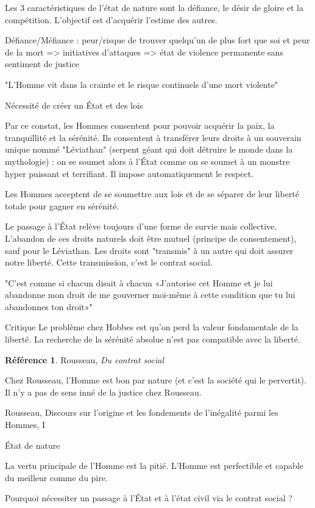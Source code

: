 \documentclass[french]{book}
\theoremstyle{definition}
\newtheorem*{refe}{Référence}
\begin{document}
Les 3 caractéristiques de l'état de nature sont la défiance, le désir de gloire et la compétition. L'objectif est d'acquérir l'estime des autres.

Défiance/Méfiance : peur/risque de trouver quelqu'un de plus fort que soi et peur de la mort => initiatives d'attaques => état de violence permanente sans sentiment de justice

"L'Homme vit dans la crainte et le risque continuels d'une mort violente"

Nécessité de créer un État et des lois

Par ce constat, les Hommes consentent pour pouvoir acquérir la paix, la tranquillité et la sérénité. Ils consentent à transférer leurs droits à un souverain unique nommé "Léviathan" (serpent géant qui doit détruire le monde dans la mythologie) : on se soumet alors à l'État comme on se soumet à un monstre hyper puissant et terrifiant. Il impose automatiquement le respect.

Les Hommes acceptent de se soumettre aux lois et de se séparer de leur liberté totale pour gagner en sérénité.

Le passage à l'État relève toujours d'une forme de survie mais collective. L'abandon de ces droits naturels doit être mutuel (principe de consentement), sauf pour le Léviathan. Les droits sont "transmis" à un autre qui doit assurer notre liberté. Cette transmission, c'est le contrat social.

"C'est comme si chacun disait à chacun «J'autorise cet Homme et je lui abandonne mon droit de me gouverner moi-même à cette condition que tu lui abandonnes ton droit»"

Critique
Le problème chez Hobbes est qu'on perd la valeur fondamentale de la liberté. La recherche de la sérénité absolue n'est pas compatible avec la liberté.


\begin{refe}
	Rousseau, \textit{Du contrat social}
\end{refe}
Chez Rousseau, l'Homme est bon par nature (et c'est la société qui le pervertit). Il n'y a pas de sens inné de la justice chez Rousseau.

Rousseau, Discours sur l’origine et les fondements de l’inégalité parmi les Hommes, I

État de nature

La vertu principale de l'Homme est la pitié. L'Homme est perfectible et capable du meilleur comme du pire.

Pourquoi nécessiter un passage à l'État et à l'état civil via le contrat social ?
\end{document}
